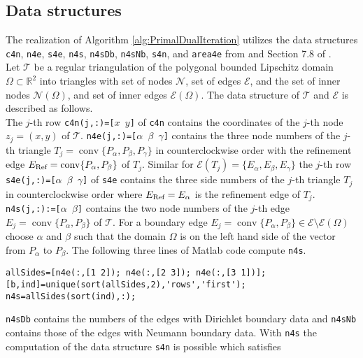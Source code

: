 \subsection{Data structures }
The realization of Algorithm \ref{alg:PrimalDualIteration} utilizes the data
structures \texttt{c4n}, 
\texttt{n4e}, \texttt{s4e}, \texttt{n4s}, \texttt{n4sDb}, \texttt{n4sNb}, \texttt{s4n},
and \texttt{area4e}
from \cite{Carstensen2017script} and Section 7.8 of \cite{CarstensenBrennerFEM}.\\
Let $\mathcal{T}$ be a regular triangulation of the polygonal bounded
Lipschitz domain $\Omega\subset \mathbb R^2$ into triangles with set of nodes
$\mathcal{N}$,
set of edges
$\mathcal{E}$, and the set of inner nodes $\mathcal{N}(\Omega)$, and set of
inner edges
$\mathcal{E}(\Omega)$. 
The data structure of $\mathcal T$ and $\mathcal E$ is described
as follows.\\
The $j$-th row \texttt{c4n(j,:)=[$x$ $y$]} of \texttt{c4n} contains the
coordinates of the $j$-th 
node $z_j=(x,y)$  
of $\mathcal T$.
\texttt{n4e(j,:)=[$\alpha$ $\beta$ $\gamma$]} contains
the three node numbers of the $j$-th triangle 
$T_j=\operatorname{conv}\{P_\alpha,P_\beta,P_\gamma\}$
in counterclockwise order with the refinement edge
$E_\textup{Ref}=\operatorname{conv}
\{P_\alpha,P_\beta\}$
of
$T_j$.
Similar  for
$\mathcal E(T_j) = \{ E_\alpha,E_\beta,E_\gamma\}$
the $j$-th row 
\texttt{s4e(j,:)=[$\alpha$ $\beta$ $\gamma$]} 
of \texttt{s4e}
contains
the three side numbers of the $j$-th triangle $T_j$
in counterclockwise order 
where
$E_\textup{Ref}=E_\alpha$
is the refinement edge of
$T_j$. 
\texttt{n4s(j,:):=[$\alpha$ $\beta$]} contains
the two node numbers of the \(j\)-th edge 
$E_j = \operatorname*{conv} \{ P_\alpha, P_\beta \}$
of $\mathcal T$.
For a boundary edge
\(E_j = \operatorname*{conv} \{ P_\alpha, P_\beta \}\in\mathcal{E}\setminus\mathcal{E}(\Omega)\)
choose $\alpha$ and $\beta$ such that the domain \(\Omega\) is on the left hand side
of the vector from \(P_\alpha\) to \(P_\beta\).
The following three lines of Matlab code compute \texttt{n4s}.
\begin{lstlisting}[frame=single,numbers=none]
allSides=[n4e(:,[1 2]); n4e(:,[2 3]); n4e(:,[3 1])];
[b,ind]=unique(sort(allSides,2),'rows','first');
n4s=allSides(sort(ind),:);
\end{lstlisting}
\texttt{n4sDb} contains the numbers of the edges with Dirichlet boundary data and 
\texttt{n4sNb} contains those of the edges with Neumann boundary data.
With \texttt{n4s} the computation of the data
structure \texttt{s4n} is possible which satisfies
